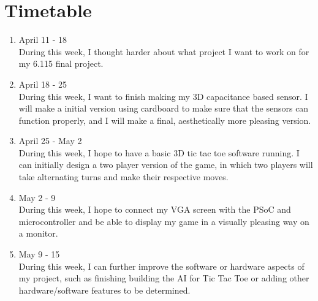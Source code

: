 \documentclass[12pt,twoside]{article}
\begin{document}
\section{Timetable}
\begin{enumerate}
\item April 11 - 18
\\ \indent During this week, I thought harder about what project I want to work on for my 6.115 final project.
\item April 18 - 25
\\ \indent During this week, I want to finish making my 3D capacitance based sensor. I will make a initial version using cardboard to make sure that the sensors can function properly, and I will make a final, aesthetically more pleasing version.
\item April 25 - May 2
\\ \indent During this week, I hope to have a basic 3D tic tac toe software running. I can initially design a two player version of the game, in which two players will take alternating turns and make their respective moves. 
\item May 2 - 9
\\ \indent During this week, I hope to connect my VGA screen with the PSoC and microcontroller and be able to display my game in a visually pleasing way on a monitor. 
\item May 9 - 15
\\ \indent During this week, I can further improve the software or hardware aspects of my project, such as finishing building the AI for Tic Tac Toe or adding other hardware/software features to be determined. 
\end{enumerate}
\end{document}
